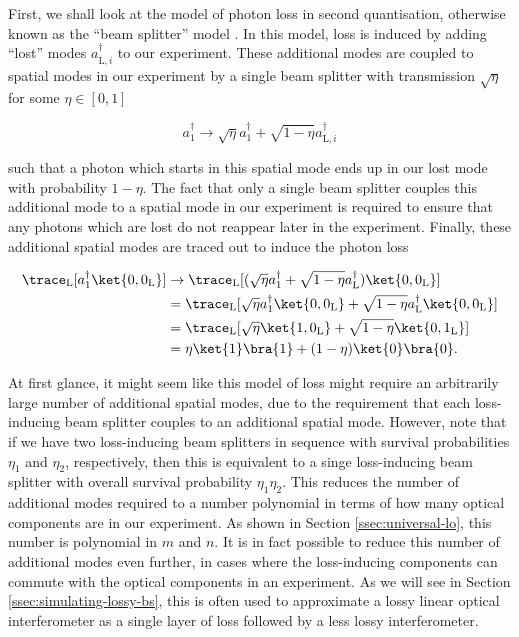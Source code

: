 First, we shall look at the model of photon loss in second quantisation, otherwise known as the ``beam splitter'' model \cite{oszmaniec2018, garciapatron2017, brod2019}. In this model, loss is induced by adding ``lost'' modes $a_{\textrm{L},i}^\dagger$ to our experiment. These additional modes are coupled to spatial modes in our experiment by a single beam splitter with transmission $\sqrt{\eta}$ for some $\eta \in [0,1]$

\begin{equation}
a_1^\dagger \rightarrow \sqrt{\eta} a_1^\dagger + \sqrt{1-\eta}a_{\textrm{L}, i}^\dagger
\end{equation}

\noindent such that a photon which starts in this spatial mode ends up in our lost mode with probability $1 - \eta$. The fact that only a single beam splitter couples this additional mode to a spatial mode in our experiment is required to ensure that any photons which are lost do not reappear later in the experiment. Finally, these additional spatial modes are traced out to induce the photon loss

\begin{align}
\trace_{\textrm{L}}[a_1^\dagger\ket{0,0_{\textrm{L}}}] &\rightarrow \trace_{\textrm{L}}[(\sqrt{\eta}a_1^\dagger + \sqrt{1-\eta}a_{\textrm{L}}^\dagger)\ket{0,0_{\textrm{L}}}]\\
&= \trace_{\textrm{L}}[\sqrt{\eta}a_1^\dagger\ket{0,0_{\textrm{L}}} + \sqrt{1-\eta}a_{\textrm{L}}^\dagger\ket{0,0_{\textrm{L}}}]\\
&= \trace_{\textrm{L}}[\sqrt{\eta}\ket{1,0_{\textrm{L}}} + \sqrt{1-\eta}\ket{0,1_{\textrm{L}}}]\\
&= \eta\ket{1}\bra{1} + (1-\eta)\ket{0}\bra{0}.
\end{align}

At first glance, it might seem like this model of loss might require an arbitrarily large number of additional spatial modes, due to the requirement that each loss-inducing beam splitter couples to an additional spatial mode. However, note that if we have two loss-inducing beam splitters in sequence with survival probabilities $\eta_1$ and $\eta_2$, respectively, then this is equivalent to a singe loss-inducing beam splitter with overall survival probability $\eta_1\eta_2$. This reduces the number of additional modes required to a number polynomial in terms of how many optical components are in our experiment. As shown in Section \ref{ssec:universal-lo}, this number is polynomial in $m$ and $n$. It is in fact possible to reduce this number of additional modes even further, in cases where the loss-inducing components can commute with the optical components in an experiment. As we will see in Section \ref{ssec:simulating-lossy-bs}, this is often used to approximate a lossy linear optical interferometer as a single layer of loss followed by a less lossy interferometer.

